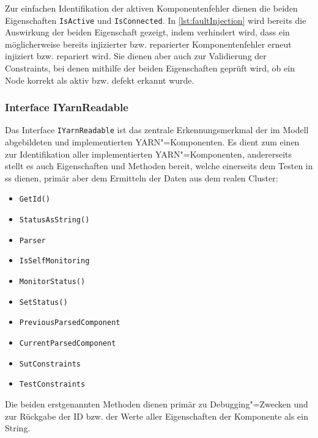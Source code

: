 Zur einfachen Identifikation der aktiven Komponentenfehler dienen die beiden Eigenschaften \texttt{IsActive} und \texttt{IsConnected}.
In \cref{lst:faultInjection} wird bereits die Auswirkung der beiden Eigenschaft gezeigt, indem verhindert wird, dass ein möglicherweise bereits injizierter bzw. reparierter Komponentenfehler erneut injiziert bzw. repariert wird.
Sie dienen aber auch zur Validierung der Constraints, bei denen mithilfe der beiden Eigenschaften geprüft wird, ob ein Node korrekt als aktiv bzw. defekt erkannt wurde.

\subsubsection{Interface IYarnReadable}
\label{subsubsec:yarnComponentInterface}

Das Interface \texttt{IYarnReadable} ist das zentrale Erkennungsmerkmal der im Modell abgebildeten und implementierten \ac{YARN}"=Komponenten.
Es dient zum einen zur Identifikation aller implementierten \ac{YARN}"=Komponenten, andererseits stellt es auch Eigenschaften und Methoden bereit, welche einerseits dem Testen in \ac{ss} dienen, primär aber dem Ermitteln der Daten aus dem realen Cluster:

\begin{itemize}
    \item \texttt{GetId()}
    \item \texttt{StatusAsString()}
    
    \item \texttt{Parser}
    \item \texttt{IsSelfMonitoring}
    \item \texttt{MonitorStatus()}
    \item \texttt{SetStatus()}
    
    \item \texttt{PreviousParsedComponent}
    \item \texttt{CurrentParsedComponent}
    \item \texttt{SutConstraints}
    \item \texttt{TestConstraints}
\end{itemize}

Die beiden erstgenannten Methoden dienen primär zu Debugging"=Zwecken und zur Rückgabe der ID bzw. der Werte aller Eigenschaften der Komponente als ein String.

